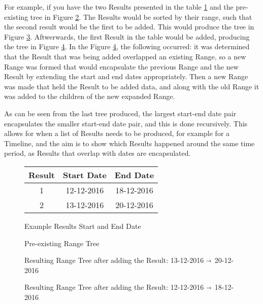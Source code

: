 \par For example, if you have the two Results presented in the table \ref{fig:resultsTable} and the pre-existing tree in Figure \ref{fig:rangeTreePre}. The Results would be sorted by their range, such that the second result would be the first to be added. This would produce the tree in Figure \ref{fig:rangeTree1}. Aftwerwards, the first Result in the table would be added, producing the tree in Figure \ref{fig:rangeTree2}. In the Figure \ref{fig:rangeTree2}, the following occurred: it was determined that the Result that was being added overlapped an existing Range, so a new Range was formed that would encapsulate the previous Range and the new Result by extending the start and end dates appropriately. Then a new Range was made that held the Result to be added data, and along with the old Range it was added to the children of the new expanded Range.
\par As can be seen from the last tree produced, the largest start-end date pair encapsulates the smaller start-end date pair, and this is done recursively. This allows for when a list of Results needs to be produced, for example for a Timeline, and the aim is to show which Results happened around the same time period, as Results that overlap with dates are encapsulated.
\begin{figure}[h]
\begin{center}
\begin{tabular}{ |c|c|c| } 
 \hline
Result & Start Date & End Date \\
\hline
\hline
1 & 12-12-2016 & 18-12-2016 \\
2 & 13-12-2016 & 20-12-2016 \\
 \hline
\end{tabular}
\end{center}
\caption{Example Results Start and End Date}
\label{fig:resultsTable}
\end{figure}
\begin{figure}[h]
\resizebox{\linewidth}{!}{
\Tree
 [.{01-01-1980  $\shortrightarrow$ 31-12-2016}
	[.{01-01-2008  $\shortrightarrow$ 31-05-2016} {01-01-2015} ]
	[{01-11-2016} ] 
]
}
\caption{Pre-existing Range Tree}
\label{fig:rangeTreePre}
\end{figure}
\begin{figure}[h]
\resizebox{\linewidth}{!}{
\Tree
 [.{01-01-1980 $\shortrightarrow$ 31-12-2016}
	[.{01-01-2008  $\shortrightarrow$ 31-05-2016} {01-01-2015} ]
	[{13-12-2016  $\shortrightarrow$ 20-12-2016} ]
	[{01-11-2016} ] 
]
}
\caption{Resulting Range Tree after adding the Result: 13-12-2016  $\shortrightarrow$ 20-12-2016}
\label{fig:rangeTree1}
\end{figure}
\begin{figure}
\caption{Resulting Range Tree after adding the Result: 12-12-2016 $\shortrightarrow$ 18-12-2016}
\label{fig:rangeTree2}
\end{figure}
